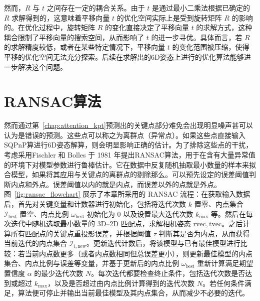 然而，$R$ 与 $t$ 之间存在一定的耦合关系。由于 $t$ 是通过最小二乘法根据已确定的 $R$ 求解得到的，这意味着平移向量 $t$ 的优化空间实际上是受到旋转矩阵 $R$ 的影响的。在优化过程中，旋转矩阵 $R$ 的变化直接决定了平移向量 $t$ 的求解方式，这种耦合限制了平移向量的搜索空间，从而影响了 $t$ 的进一步寻优。具体而言，若 $R$ 的求解精度较低，或者在某些特定情况下，平移向量 $t$ 的变化范围被压缩，使得平移的优化空间无法充分探索。后续在求解出的6D姿态上进行的优化算法能够进一步解决这个问题。






\section{RANSAC算法}
\label{sec:ransac_pnp}

然而通过第~\ref{chap:attention_kpt}预测出的关键点部分难免会出现明显噪声甚可以认为是错误的预测。这些点可以称之为离群点（异常点）。如果这些点直接输入SQPnP算进行6D姿态解算，则会明显影响正确的估计。为了排除这些点的干扰，考虑采用Fischler 和 Bolles 于 1981 年提出RANSAC算法，用于在含有大量异常值的环境下对模型参数进行鲁棒估计。它在数据中反复随机抽取最小数量的样本来拟合模型，如果将其应用与关键点的离群点的剔除那么。可以预先设定的误差阈值判断内点和外点。误差阈值以内的就是内点，而误差以外的点就是外点。图~\ref{fig:ransac_flowchart} 展示了本章所采用的 RANSAC 流程：在获取输入数据后，首先对关键变量和计数器进行初始化，包括将迭代次数 \(k\) 置零、内点集合 \(\mathcal{I}_{\text{best}}\) 置空、内点比例 \(\omega_{\text{best}}\) 初始化为 0 以及设置最大迭代次数 \(k_{\max}\) 等。然后在每次迭代中随机选取最小数量的 3D--2D 匹配点，求解相机姿态 \(\mathrm{rvec}, \mathrm{tvec}\)。之后计算所有匹配点的关键点重投影误差，并根据阈值 \(\tau\) 判断其是否为内点，从而获得当前迭代的内点集合 \(\mathcal{I}_{i,\text{new}}\)。更新迭代计数后，将该模型与已有最佳模型进行比较：若当前内点数更多（或者内点数相同但总误差更小），则更新最佳模型的内点集合、内点比例与误差等变量，并基于更新后的内点比例 \(\omega_{\text{best}}\) 重新计算满足期望置信度 \(\alpha\) 的最少迭代次数 \(N\)。每次迭代都要检查终止条件，包括迭代次数是否达到或超过 \(k_{\max}\)，以及是否超过由内点比例计算得到的迭代次数 \(N\)。若任何条件满足，算法便可停止并输出当前最佳模型及其内点集合，从而减少不必要的迭代。


